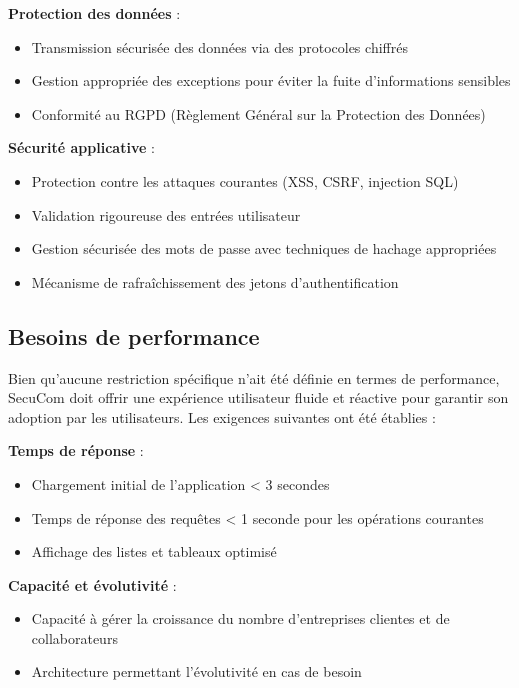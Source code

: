 \newpage
\textbf{Protection des données} :
\begin{itemize}[leftmargin=*,label=\textcolor{darkgray}{$\bullet$},itemsep=0.3em]
  \item Transmission sécurisée des données via des protocoles chiffrés
  \item Gestion appropriée des exceptions pour éviter la fuite d'informations sensibles
  \item Conformité au RGPD (Règlement Général sur la Protection des Données)
\end{itemize}


\vspace{0.5cm}
\textbf{Sécurité applicative} :
\begin{itemize}[leftmargin=*,label=\textcolor{darkgray}{$\bullet$},itemsep=0.3em]
  \item Protection contre les attaques courantes (XSS, CSRF, injection SQL)
  \item Validation rigoureuse des entrées utilisateur
  \item Gestion sécurisée des mots de passe avec techniques de hachage appropriées
  \item Mécanisme de rafraîchissement des jetons d'authentification
\end{itemize}

\subsection{Besoins de performance}

Bien qu'aucune restriction spécifique n'ait été définie en termes de performance, SecuCom doit offrir une expérience utilisateur fluide et réactive pour garantir son adoption par les utilisateurs. Les exigences suivantes ont été établies :


\vspace{0.5cm}
\textbf{Temps de réponse} :
\begin{itemize}[leftmargin=*,label=\textcolor{darkgray}{$\bullet$},itemsep=0.3em]
  \item Chargement initial de l'application < 3 secondes
  \item Temps de réponse des requêtes < 1 seconde pour les opérations courantes
  \item Affichage des listes et tableaux optimisé
\end{itemize}


\vspace{0.5cm}
\textbf{Capacité et évolutivité} :
\begin{itemize}[leftmargin=*,label=\textcolor{darkgray}{$\bullet$},itemsep=0.3em]
  \item Capacité à gérer la croissance du nombre d'entreprises clientes et de collaborateurs
  \item Architecture permettant l'évolutivité en cas de besoin
\end{itemize}


